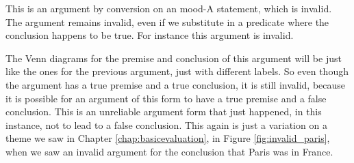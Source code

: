 This is an argument by conversion on an mood-A statement, which is invalid. The argument remains invalid, even if we substitute in a predicate where the conclusion happens to be true. For instance this argument is invalid.

\begin{kormanize}
\end{kormanize}

The Venn diagrams for the premise and conclusion of this argument will be just like the ones for the previous argument, just with different labels. So even though the argument has a true premise and a true conclusion, it is still invalid, because it is possible for an argument of this form to have a true premise and a false conclusion. This is an unreliable argument form that just happened, in this instance, not to lead to a false conclusion. This again is just a variation on a theme we saw in Chapter \ref{chap:basicevaluation}, in Figure \ref{fig:invalid_paris}, when we saw an invalid argument for the conclusion that Paris was in France.
